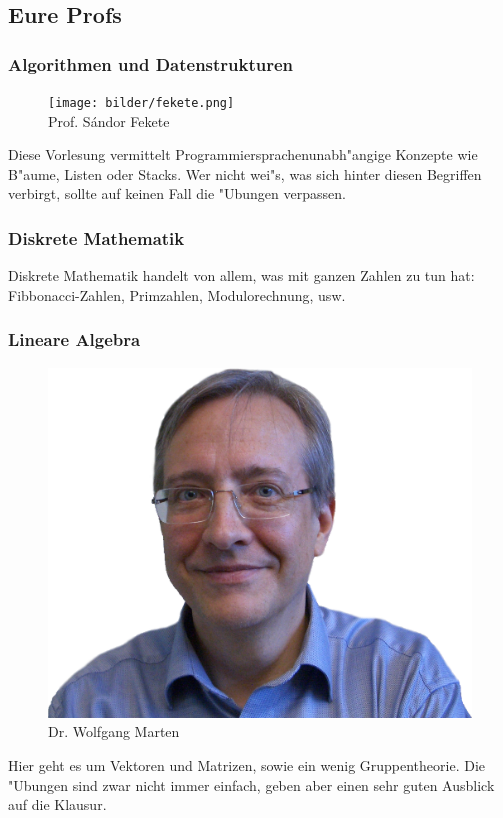 \subsection{Eure Profs}

\subsubsection{Algorithmen und Datenstrukturen}

\begin{figure}[h]
	\centering\texttt{[image: bilder/fekete.png]}\\
	{Prof. S\'andor Fekete}
\end{figure}
Diese Vorlesung vermittelt Programmiersprachenunabh"angige Konzepte wie B"aume, Listen oder Stacks. Wer nicht wei"s, was sich hinter diesen Begriffen verbirgt, sollte auf keinen Fall die "Ubungen verpassen.


\subsubsection{Diskrete Mathematik}

Diskrete Mathematik handelt von allem, was mit ganzen Zahlen zu tun hat: Fibbonacci-Zahlen, Primzahlen, Modulorechnung, usw.


\subsubsection{Lineare Algebra}

\begin{figure}[h]
	\centering\includegraphics[width=0.7\linewidth]{bilder/marten_frei.png}\\
	{Dr. Wolfgang Marten}
\end{figure}
Hier geht es um Vektoren und Matrizen, sowie ein wenig Gruppentheorie. Die
"Ubungen sind zwar nicht immer einfach, geben aber einen sehr guten Ausblick auf die Klausur.


